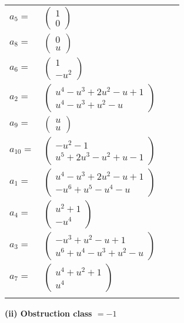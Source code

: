 \documentclass[1p]{elsarticle_modified}
\theoremstyle{definition}
\begin{document}
\begin{tabular}{m{7pt} m{180pt} m{7pt} m{180pt} }
\flushright $a_{5}=$&$\begin{pmatrix}1\\0\end{pmatrix}$ \\
\flushright $a_{8}=$&$\begin{pmatrix}0\\u\end{pmatrix}$ \\
\flushright $a_{6}=$&$\begin{pmatrix}1\\- u^2\end{pmatrix}$ \\
\flushright $a_{2}=$&$\begin{pmatrix}u^4- u^3+2 u^2- u+1\\u^4- u^3+u^2- u\end{pmatrix}$ \\
\flushright $a_{9}=$&$\begin{pmatrix}u\\u\end{pmatrix}$ \\
\flushright $a_{10}=$&$\begin{pmatrix}- u^2-1\\u^5+2 u^3- u^2+u-1\end{pmatrix}$ \\
\flushright $a_{1}=$&$\begin{pmatrix}u^4- u^3+2 u^2- u+1\\- u^6+u^5- u^4- u\end{pmatrix}$ \\
\flushright $a_{4}=$&$\begin{pmatrix}u^2+1\\- u^4\end{pmatrix}$ \\
\flushright $a_{3}=$&$\begin{pmatrix}- u^3+u^2- u+1\\u^6+u^4- u^3+u^2- u\end{pmatrix}$ \\
\flushright $a_{7}=$&$\begin{pmatrix}u^4+u^2+1\\u^4\end{pmatrix}$\\&\end{tabular}
\flushleft \textbf{(ii) Obstruction class $= -1$}\\~\\
\end{document}
